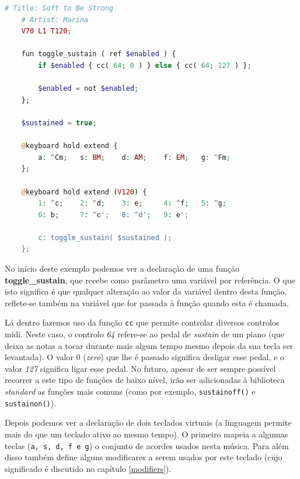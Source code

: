\documentclass[
  oneside,
  11pt, a4paper,
  footinclude=true,
  headinclude=true,
  cleardoublepage=empty
]{scrbook}
\begin{document}
    \begin{lstlisting}[caption=Exemplo da sintaxe para criação de teclados,language=PHP]
    # Title: Soft to Be Strong
    # Artist: Marina
    V70 L1 T120;

    fun toggle_sustain ( ref $enabled ) {
        if $enabled { cc( 64; 0 ) } else { cc( 64; 127 ) };

        $enabled = not $enabled;
    };
    
    $sustained = true;
    
    @keyboard hold extend {
        a: ^Cm;   s: BM;    d: AM;    f: EM;   g: ^Fm;
    };
    
    @keyboard hold extend (V120) {
        1: ^c;    2: ^d;    3: e;     4: ^f;   5: ^g;
        6: b;     7: ^c';   8: ^d';   9: e';

        c: toggle_sustain( $sustained );
    };
    \end{lstlisting}
    
    No início deste exemplo podemos ver a declaração de uma função \textbf{toggle\_sustain}, que recebe como parâmetro uma variável por referência. O que isto significa é que qualquer alteração ao valor da variável dentro desta função, reflete-se também na variável que for passada à função quando esta é chamada. 
    
    Lá dentro fazemos uso da função \texttt{cc} que permite controlar diversos controlos \acrshort{midi}. Neste caso, o controlo \textit{64} refere-se ao pedal de \textit{sustain} de um piano (que deixa as notas a tocar durante mais algum tempo mesmo depois da sua tecla ser levantada). O valor 0 (\textit{zero}) que lhe é passado significa desligar esse pedal, e o valor \textit{127} significa ligar esse pedal. No futuro, apesar de ser sempre possível recorrer a este tipo de funções de baixo nível, irão ser adicionadas à biblioteca \textit{standard} as funções mais comuns (como por exemplo, \texttt{sustainoff()} e \texttt{sustainon()}).
    
    Depois podemos ver a declaração de dois teclados virtuais (a linguagem permite mais do que um teclado ativo ao mesmo tempo). O primeiro mapeia a algumas teclas (\texttt{a, s, d, f e g}) o conjunto de acordes usados nesta música. Para além disso também define alguns modificares a serem usados por este teclado (cujo significado é discutido no capítulo \ref{modifiers}).
    
\end{document}
